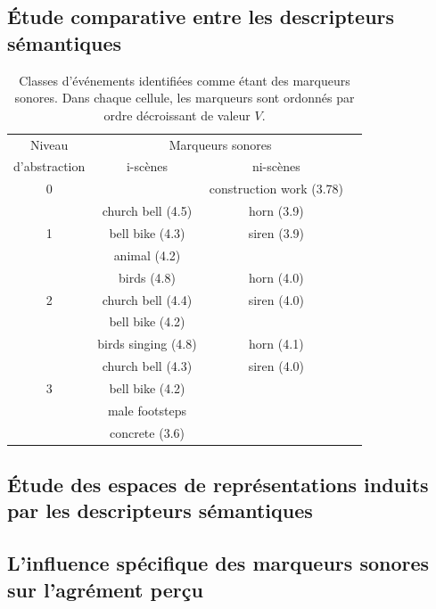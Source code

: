 \subsection{Étude comparative entre les descripteurs sémantiques}

\begin{table}[t]
 \setlength{\tabcolsep}{0.2pt}
 \centering
  {\renewcommand{\arraystretch}{0.9}
\begin{tabular}{c c c c} 
Niveau        & \multicolumn{2}{c}{Marqueurs sonores} \\
d'abstraction & i-scènes & ni-scènes \\
\hline
0  &                               &  construction work (3.78)  \\
\hline
  & church bell  (4.5)             & horn  (3.9) \\
1 & bell bike    (4.3)             & siren (3.9)\\
  & animal       (4.2)             &       \\
   \hline
  & birds        (4.8)             & horn  (4.0)\\
2 & church bell  (4.4)             & siren (4.0)\\
  & bell bike    (4.2)             &       \\
   \hline
  & birds singing (4.8)            & horn  (4.1)\\
  & church bell   (4.3)            & siren (4.0)\\
3 & bell bike     (4.2)            &       \\
  & male footsteps                 &  \\
  &   concrete (3.6)               &  \\
  \hline
\end{tabular}
}
\vspace{0.5mm}
\caption[Classes d'événements identifiées comme étant des marqueurs sonores]{Classes d'événements identifiées comme étant des marqueurs sonores. Dans chaque cellule, les marqueurs sont ordonnés par ordre décroissant de valeur $V$.}
\label{tab:markers}
\end{table}

\subsection{Étude des espaces de représentations induits par les descripteurs sémantiques}

\subsection{L'influence spécifique des marqueurs sonores sur l'agrément perçu}

